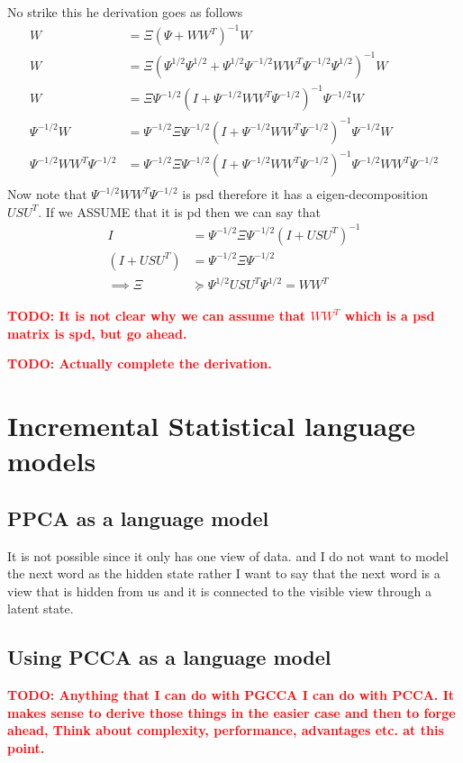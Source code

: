 \documentclass[11pt]{article}
\newcommand{\todo}[1]{\textbf{\textcolor{red}{TODO: #1}}}
\begin{document}
No strike this he derivation goes as follows
\begin{align}
  W &= \Xi(\Psi + WW^T)^{-1}W \\
  W &= \Xi(\Psi^{1/2}\Psi^{1/2} + \Psi^{1/2}\Psi^{-1/2}WW^T\Psi^{-1/2}\Psi^{1/2})^{-1}W \\
  W &= \Xi\Psi^{-1/2}(I + \Psi^{-1/2}WW^T\Psi^{-1/2})^{-1}\Psi^{-1/2}W \\
  \Psi^{-1/2}W &= \Psi^{-1/2}\Xi\Psi^{-1/2}(I + \Psi^{-1/2}WW^T\Psi^{-1/2})^{-1}\Psi^{-1/2}W \\
  \Psi^{-1/2}WW^T\Psi^{-1/2} &= \Psi^{-1/2}\Xi\Psi^{-1/2}(I + \Psi^{-1/2}WW^T\Psi^{-1/2})^{-1}\Psi^{-1/2}WW^T\Psi^{-1/2} \\
\end{align}
Now note that $\Psi^{-1/2}WW^T\Psi^{-1/2}$ is psd therefore it has a eigen-decomposition $USU^T$.
If we ASSUME that it is pd then we can say that 
\begin{align}
  I &= \Psi^{-1/2}\Xi\Psi^{-1/2}(I+USU^T)^{-1}\\
  (I+USU^T) &= \Psi^{-1/2}\Xi\Psi^{-1/2} \\
  \implies \Xi  &\succcurlyeq \Psi^{1/2}USU^T\Psi^{1/2} = WW^T
\end{align}

\todo{It is not clear why we can assume that $WW^T$ which is a psd matrix is spd, but go ahead.}
 
\todo{Actually complete the derivation.}

\section{Incremental Statistical language models}
\subsection{PPCA as a language model}
It is not possible since it only has one view of data. and I do not
want to model the next word as the hidden state rather I want to say
that the next word is a view that is hidden from us and it is
connected to the visible view through a latent state.  

\subsection{Using PCCA as a language model}
\todo{Anything that I can do with PGCCA I can do with PCCA. It makes
  sense to derive those things in the easier case and then to forge
  ahead, Think about complexity, performance, advantages etc. at this
  point.}
\end{document}
